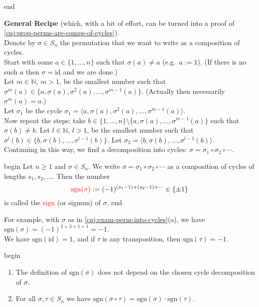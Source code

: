 \documentclass[
  12pt,
  a4paper,
  twoside]{article}
\theoremstyle{plain}
\theoremstyle{definition}
\begin{document}
\csname end

\textbf{General Recipe} (which, with a bit of effort, can be turned into a proof of \ref{cnj:prop-perms-are-comps-of-cycles}).\\
Denote by \(\sigma\in S_n\) the permutation that we want to write as a composition of cycles.\\
Start with some \(a\in\{1,\dots,n\}\) such that \(\sigma(a)\neq a\) (e.g.~\(a:=1\)). (If there is no such \(a\) then \(\sigma=\mathrm{id}\) and we are done.)\\
Let \(m\in\mathbb{N}\), \(m>1\), be the smallest number such that \(\sigma^m(a)\in \{a,\sigma(a),\sigma^2(a),\dots,\sigma^{m-1}(a)\}\). (Actually then necessarily \(\sigma^m(a)=a\).)\\
Let \(\sigma_1\) be the cycle \(\sigma_1=\langle a,\sigma(a),\sigma^2(a),\dots,\sigma^{m-1}(a)\rangle\).\\
Now repeat the steps: take \(b\in\{1,\dots,n\}\setminus\{a,\sigma(a),\dots,\sigma^{m-1}(a)\}\) such that \(\sigma(b)\neq b\). Let \(l\in\mathbb{N}\), \(l>1\), be the smallest number such that \(\sigma^l(b)\in\{b,\sigma(b),\dots,\sigma^{l-1}(b)\}\). Let \(\sigma_2=\langle b,\sigma(b),\dots,\sigma^{l-1}(b)\rangle\).\\
Continuing in this way, we find a decomposition into cycles: \(\sigma=\sigma_1\circ \sigma_2\circ\cdots\).

\csname begin\label{cnj:defn-sign}
Let \(n\geq 1\) and \(\sigma\in S_n\). We write \(\sigma=\sigma_1\circ\sigma_2\circ\cdots\) as a composition of cycles of lengths \(s_1,s_2,\dots\). Then the number
\[
{\color{red}{\mathrm{sgn}(\sigma)}} := (-1)^{(s_1-1)+(s_2-1)+\cdots}\in\{\pm1\}
\]
is called the \textcolor{red}{sign} (or signum) of \(\sigma\).
\csname end

For example, with \(\sigma\) as in \ref{cnj:exam-perm-into-cycles}(a), we have \(\mathrm{sgn}(\sigma)=(-1)^{2+3+1+1}=-1\).\\
We have \(\mathrm{sgn}(\mathrm{id})=1\), and if \(\tau\) is any transposition, then \(\mathrm{sgn}(\tau)=-1\).

\csname begin\label{cnj:theo-indep-sign}

\begin{enumerate}
\def\labelenumi{(\alph{enumi})}
\item
  The definition of \(\mathrm{sgn}(\sigma)\) does not depend on the chosen cycle decomposition of \(\sigma\).
\item
  For all \(\sigma,\tau\in S_n\) we have \(\mathrm{sgn}(\sigma\circ\tau)=\mathrm{sgn}(\sigma)\cdot\mathrm{sgn}(\tau)\).
\end{enumerate}
\end{document}

